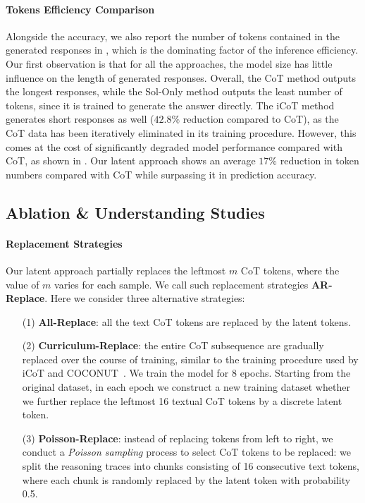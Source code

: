 \paragraph{Tokens Efficiency Comparison}
Alongside the accuracy, we also report the number of tokens contained in the generated responses in , which is the dominating factor of the inference efficiency. 
Our first observation is that for all the approaches, the model size has little influence on the length of generated responses.
Overall, the CoT method outputs the longest responses, while the Sol-Only method outputs the least number of tokens, since it is trained to generate the answer directly. The iCoT method generates short responses as well ($42.8\%$ reduction compared to CoT), as the CoT data has been iteratively eliminated in its training procedure. However, this comes at the cost of significantly degraded model performance compared with CoT, as shown in . Our latent approach shows an average $17\%$ reduction in token numbers compared with CoT while surpassing it in prediction accuracy.


\subsection{Ablation \& Understanding Studies}
\label{sec:expr_ablation}

\paragraph{Replacement Strategies}
Our latent approach partially replaces the leftmost $m$ CoT tokens, where the value of $m$ varies for each sample. We call such replacement strategies \textbf{AR-Replace}. Here we consider three alternative strategies:
\begin{enumerate}[topsep=0pt]
    \item[(1)] \textbf{All-Replace}: all the text CoT tokens are replaced by the latent tokens.
    \item[(2)] \textbf{Curriculum-Replace}: the entire CoT subsequence are gradually replaced over the course of training, similar to the training procedure used by iCoT and COCONUT~\cite{hao2024training}. We train the model for 8 epochs. Starting from the original dataset, in each epoch we construct a new training dataset whether we further replace the leftmost 16 textual CoT tokens by a discrete latent token.
    \item[(3)] \textbf{Poisson-Replace}: instead of replacing tokens from left to right, we conduct a \emph{Poisson sampling} process to select CoT tokens to be replaced: we split the reasoning traces into chunks consisting of 16 consecutive text tokens, where each chunk is randomly replaced by the latent token with probability 0.5. 
    
\end{enumerate}


